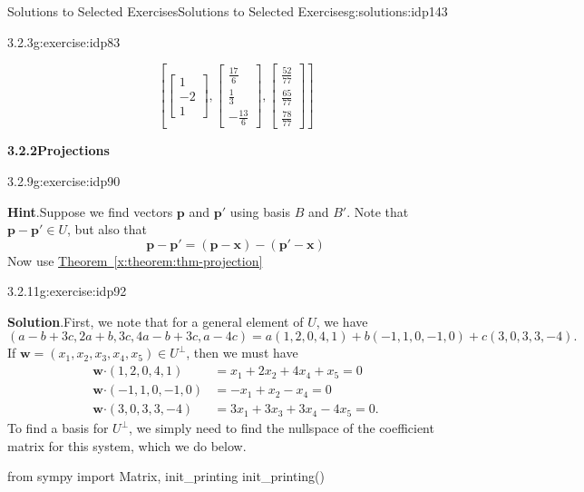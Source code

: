 \documentclass[oneside,10pt,]{book}
\newcommand{\blocktitlefont}{\relax}
\newcommand{\xreffont}{\relax}
\numberwithin{equation}{section}
\newcommand{\bbm}{\begin{bmatrix}}
\newcommand{\ebm}{\end{bmatrix}}
\newcommand{\dotp}{\!\boldsymbol{\cdot}\!}
\newcommand{\ww}{\mathbf{w}}
\newcommand{\xx}{\mathbf{x}}
\newcommand{\amp}{&}
\begin{document}
\begin{solutions-chapter}{Solutions to Selected Exercises}{}{Solutions to Selected Exercises}{}{}{g:solutions:idp143}
\begin{inlinesolution}{3.2.3}{}{g:exercise:idp83}
\begin{sageinput}
\end{sageinput}
\begin{sageoutput}
\[\left[\bbm 1\\-2\\1\ebm, \bbm \frac{17}{6}\\ \frac13\\ -\frac{13}{6}\ebm, \bbm \frac{52}{77}\\ \frac{65}{77}\\ \frac{78}{77}\ebm\right]\]
\end{sageoutput}
\end{inlinesolution}%
\par\medskip
\noindent\textbf{\Large{}3.2.2\space\textperiodcentered\space{}Projections}
\begin{inlinesolution}{3.2.9}{}{g:exercise:idp90}%
\par\smallskip%
\noindent\textbf{\blocktitlefont Hint}.\hypertarget{g:hint:idp91-back}{}\quad{}Suppose we find vectors \(\mathbf{p}\) and \(\mathbf{p}'\) using basis \(B\) and \(B'\). Note that \(\mathbf{p}-\mathbf{p}'\in U\), but also that%
\begin{equation*}
\mathbf{p}-\mathbf{p}' = (\mathbf{p}-\xx)-(\mathbf{p}'-\xx)
\end{equation*}
Now use \hyperref[x:theorem:thm-projection]{Theorem~{\xreffont\ref{x:theorem:thm-projection}}}%
\end{inlinesolution}%
\begin{inlinesolution}{3.2.11}{}{g:exercise:idp92}%
\par\smallskip%
\noindent\textbf{\blocktitlefont Solution}.\hypertarget{g:solution:idp170-back}{}\quad{}First, we note that for a general element of \(U\), we have%
\begin{equation*}
(a-b+3c, 2a+b, 3c, 4a-b+3c,a-4c) = a(1,2,0,4,1)+b(-1,1,0,-1,0)+c(3,0,3,3,-4)\text{.}
\end{equation*}
If \(\ww = (x_1,x_2,x_3,x_4,x_5)\in U^\bot\), then we must have%
\begin{align*}
\ww\dotp (1,2,0,4,1) \amp = x_1+2x_2+4x_4+x_5=0 \\
\ww\dotp (-1,1,0,-1,0) \amp =-x_1+x_2-x_4=0\\
\ww\dotp (3,0,3,3,-4) \amp =3x_1+3x_3+3x_4-4x_5 = 0\text{.}
\end{align*}
To find a basis for \(U^\bot\), we simply need to find the nullspace of the coefficient matrix for this system, which we do below.%
\begin{sageinput}
from sympy import Matrix, init_printing
init_printing()

\end{sageinput}
\end{inlinesolution}
\end{solutions-chapter}
\end{document}
